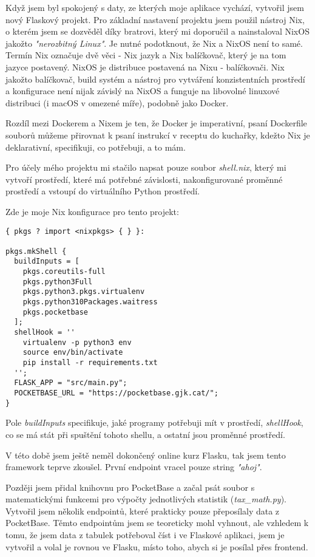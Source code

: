 \documentclass[11pt,a4paper,twoside,openright]{report}
\begin{document}
Když jsem byl spokojený s daty, ze kterých moje aplikace vychází, vytvořil jsem nový Flaskový projekt.
Pro základní nastavení projektu jsem použil nástroj Nix, o kterém jsem se dozvěděl díky bratrovi, který
mi doporučil a nainstaloval NixOS jakožto \emph{"nerozbitný Linux"}. Je nutné podotknout, že Nix a NixOS
není to samé. Termín Nix označuje dvě věci - Nix jazyk a Nix balíčkovač, který je na tom jazyce postavený.
NixOS je distribuce postavená na Nixu - balíčkovači. Nix jakožto balíčkovač, build systém a nástroj pro
vytváření konzistentních prostředí a konfigurace není nijak závislý na NixOS a funguje na libovolné
linuxové distribuci (i macOS v omezené míře), podobně jako Docker.

Rozdíl mezi Dockerem a Nixem je ten, že Docker je imperativní, psaní Dockerfile souborů můžeme přirovnat
k psaní instrukcí v receptu do kuchařky, kdežto Nix je deklarativní, specifikuji, co potřebuji, a to mám.

Pro účely mého projektu mi stačilo napsat pouze soubor \emph{shell.nix}, který mi vytvoří prostředí,
které má potřebné závislosti, nakonfigurované proměnné prostředí a vstoupí do virtuálního Python prostředí.

Zde je moje Nix konfigurace pro tento projekt:
\begin{verbatim}
{ pkgs ? import <nixpkgs> { } }:

pkgs.mkShell {
  buildInputs = [
    pkgs.coreutils-full
    pkgs.python3Full
    pkgs.python3.pkgs.virtualenv
    pkgs.python310Packages.waitress
    pkgs.pocketbase
  ];
  shellHook = ''
    virtualenv -p python3 env
    source env/bin/activate
    pip install -r requirements.txt
  '';
  FLASK_APP = "src/main.py";
  POCKETBASE_URL = "https://pocketbase.gjk.cat/";
}
\end{verbatim}

Pole \emph{buildInputs} specifikuje, jaké programy potřebuji mít v prostředí, \emph{shellHook}, co se má
stát při spuštění tohoto shellu, a ostatní jsou proměnné prostředí.


V této době jsem ještě neměl dokončený online kurz Flasku, tak jsem tento framework teprve zkoušel. První
endpoint vracel pouze string \emph{"ahoj"}.

Později jsem přidal knihovnu pro PocketBase a začal psát soubor s matematickými funkcemi pro výpočty
jednotlivých statistik (\emph{tax\_math.py}). Vytvořil jsem několik endpointů, které prakticky pouze
přeposílaly data z PocketBase. Těmto endpointům jsem se teoreticky mohl vyhnout, ale vzhledem k tomu,
že jsem data z tabulek potřeboval číst i ve Flaskové aplikaci, jsem je vytvořil a volal je rovnou ve
Flasku, místo toho, abych si je posílal přes frontend.
\end{document}
